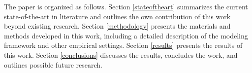 The paper is organized as follows. Section \ref{stateoftheart} summarizes the current state-of-the-art in literature and outlines the own contribution of this work beyond existing research. Section \ref{methodology} presents the materials and methods developed in this work, including a detailed description of the modeling framework and other empirical settings. Section \ref{results} presents the results of this work. Section \ref{conclusions} discusses the results, concludes the work, and outlines possible future research.